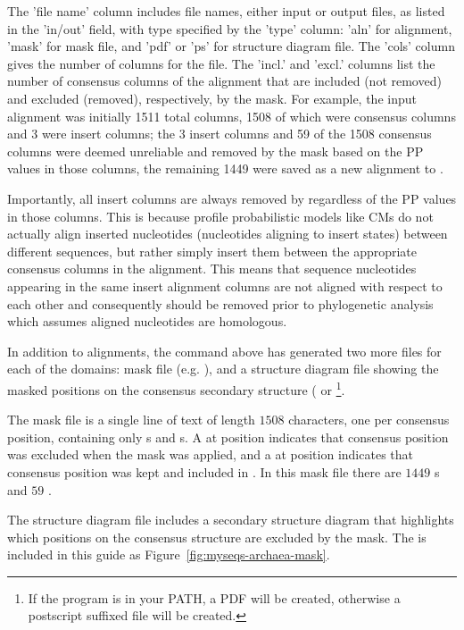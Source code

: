 The 'file name' column includes file names, either input or output
files, as listed in the 'in/out' field, with type specified by the
'type' column: 'aln' for alignment, 'mask' for mask file, and 'pdf' or
'ps' for structure diagram file. The 'cols' column gives the number of
columns for the file. The 'incl.' and 'excl.' columns list the number
of consensus columns of the alignment that are included (not removed)
and excluded (removed), respectively, by the mask. For example, the
 input alignment was initially 1511 total
columns, 1508 of which were consensus columns and 3 were insert
columns; the 3 insert columns and 59 of the 1508 consensus columns
were deemed unreliable and removed by the mask based on the PP values
in those columns, the remaining 1449 were saved as a new alignment to
.

Importantly, all insert columns are always removed by 
regardless of the PP values in those columns. This is because profile
probabilistic models like CMs do not actually align inserted nucleotides
(nucleotides aligning to insert states) between different sequences, but
rather simply insert them between the appropriate consensus columns in
the alignment. This means that sequence nucleotides appearing in the same
insert alignment columns are not aligned with respect to each
other and consequently should be removed prior to phylogenetic
analysis which assumes aligned nucleotides are homologous.

In addition to alignments, the command above has generated two more files
for each of the domains: 
mask file (e.g. ), and a structure diagram file
showing the masked positions on the consensus secondary structure
( or
 \footnote{If the program  is
    in your PATH, a PDF will be created, otherwise a postscript
     suffixed file will be created.}.

The mask file is a single line of text of length $1508$ characters, one per
consensus position, containing only s and s. 
A  at position  indicates that consensus position 
was excluded when the mask was applied, and a  at position
 indicates that consensus position  was kept and
included in . In this mask file there are
$1449$ s and $59$ .

The structure diagram file includes a secondary structure diagram that
highlights which positions on the consensus structure are excluded by
the mask. The  is included in this guide
as Figure~\ref{fig:myseqs-archaea-mask}.

